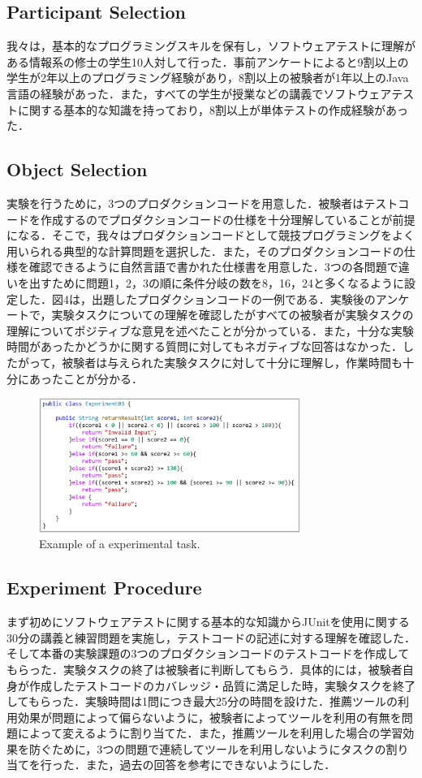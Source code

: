 \documentclass[conference]{IEEEtran}
\begin{document}
\subsection{Participant Selection}
我々は，基本的なプログラミングスキルを保有し，ソフトウェアテストに理解がある情報系の修士の学生10人対して行った．事前アンケートによると9割以上の学生が2年以上のプログラミング経験があり，8割以上の被験者が1年以上のJava言語の経験があった．また，すべての学生が授業などの講義でソフトウェアテストに関する基本的な知識を持っており，8割以上が単体テストの作成経験があった．

\subsection{Object Selection}
実験を行うために，3つのプロダクションコードを用意した．被験者はテストコードを作成するのでプロダクションコードの仕様を十分理解していることが前提になる．そこで，我々はプロダクションコードとして競技プログラミングをよく用いられる典型的な計算問題を選択した．また，そのプロダクションコードの仕様を確認できるように自然言語で書かれた仕様書を用意した．3つの各問題で違いを出すために問題1，2，3の順に条件分岐の数を8，16，24と多くなるように設定した．図4は，出題したプロダクションコードの一例である．実験後のアンケートで，実験タスクについての理解を確認したがすべての被験者が実験タスクの理解についてポジティブな意見を述べたことが分かっている．また，十分な実験時間があったかどうかに関する質問に対してもネガティブな回答はなかった．したがって，被験者は与えられた実験タスクに対して十分に理解し，作業時間も十分にあったことが分かる．

\begin{figure}[htbp]
\centerline{\includegraphics[width=8.5cm]{src.pdf}}
\caption{Example of a experimental task.}
\label{fig}
\end{figure}

\subsection{Experiment Procedure}
まず初めにソフトウェアテストに関する基本的な知識からJUnitを使用に関する30分の講義と練習問題を実施し，テストコードの記述に対する理解を確認した．そして本番の実験課題の3つのプロダクションコードのテストコードを作成してもらった．実験タスクの終了は被験者に判断してもらう．具体的には，被験者自身が作成したテストコードのカバレッジ・品質に満足した時，実験タスクを終了してもらった．実験時間は1問につき最大25分の時間を設けた．推薦ツールの利用効果が問題によって偏らないように，被験者によってツールを利用の有無を問題によって変えるように割り当てた．また，推薦ツールを利用した場合の学習効果を防ぐために，3つの問題で連続してツールを利用しないようにタスクの割り当てを行った．また，過去の回答を参考にできないようにした．
\end{document}
